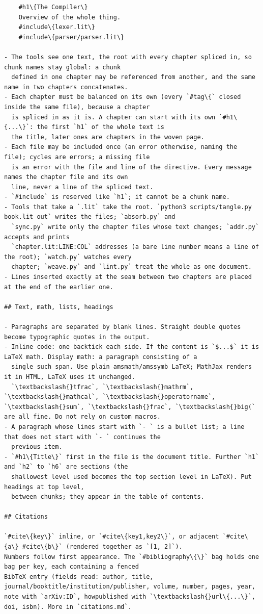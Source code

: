 \documentclass[10pt,a4paper]{article}
\newcounter{chunk}
\begin{document}
\begin{Verbatim}
    #h1\{The Compiler\}
    Overview of the whole thing.
    #include\{lexer.lit\}
    #include\{parser/parser.lit\}

- The tools see one text, the root with every chapter spliced in, so chunk names stay global: a chunk
  defined in one chapter may be referenced from another, and the same name in two chapters concatenates.
- Each chapter must be balanced on its own (every `#tag\{` closed inside the same file), because a chapter
  is spliced in as it is. A chapter can start with its own `#h1\{...\}`: the first `h1` of the whole text is
  the title, later ones are chapters in the woven page.
- Each file may be included once (an error otherwise, naming the file); cycles are errors; a missing file
  is an error with the file and line of the directive. Every message names the chapter file and its own
  line, never a line of the spliced text.
- `#include` is reserved like `h1`; it cannot be a chunk name.
- Tools that take a `.lit` take the root. `python3 scripts/tangle.py book.lit out` writes the files; `absorb.py` and
  `sync.py` write only the chapter files whose text changes; `addr.py` accepts and prints
  `chapter.lit:LINE:COL` addresses (a bare line number means a line of the root); `watch.py` watches every
  chapter; `weave.py` and `lint.py` treat the whole as one document.
- Lines inserted exactly at the seam between two chapters are placed at the end of the earlier one.

## Text, math, lists, headings

- Paragraphs are separated by blank lines. Straight double quotes become typographic quotes in the output.
- Inline code: one backtick each side. If the content is `$...$` it is LaTeX math. Display math: a paragraph consisting of a
  single such span. Use plain amsmath/amssymb LaTeX; MathJax renders it in HTML, LaTeX uses it unchanged.
  `\textbackslash{}tfrac`, `\textbackslash{}mathrm`, `\textbackslash{}mathcal`, `\textbackslash{}operatorname`, `\textbackslash{}sum`, `\textbackslash{}frac`, `\textbackslash{}big(` are all fine. Do not rely on custom macros.
- A paragraph whose lines start with `- ` is a bullet list; a line that does not start with `- ` continues the
  previous item.
- `#h1\{Title\}` first in the file is the document title. Further `h1` and `h2` to `h6` are sections (the
  shallowest level used becomes the top section level in LaTeX). Put headings at top level,
  between chunks; they appear in the table of contents.

## Citations

`#cite\{key\}` inline, or `#cite\{key1,key2\}`, or adjacent `#cite\{a\} #cite\{b\}` (rendered together as `[1, 2]`).
Numbers follow first appearance. The `#bibliography\{\}` bag holds one bag per key, each containing a fenced
BibTeX entry (fields read: author, title, journal/booktitle/institution/publisher, volume, number, pages, year,
note with `arXiv:ID`, howpublished with `\textbackslash{}url\{...\}`, doi, isbn). More in `citations.md`.


\end{Verbatim}
\end{document}
